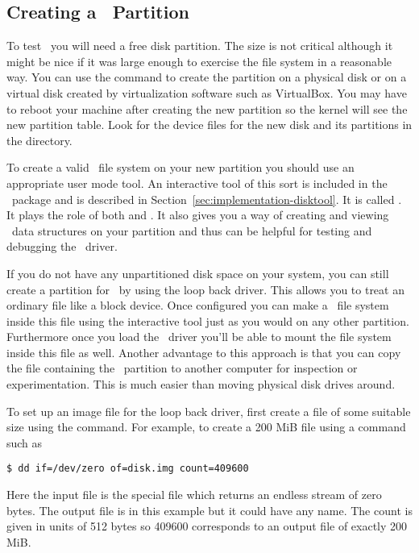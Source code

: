 \subsection{Creating a \GenericFS\ Partition}
\label{sec:partition}

To test \GenericFS\ you will need a free disk partition. The size is not critical although it
might be nice if it was large enough to exercise the file system in a reasonable way. You can
use the  command to create the partition on a physical disk or on a virtual disk
created by virtualization software such as VirtualBox. You may have to reboot your machine after
creating the new partition so the kernel will see the new partition table. Look for the device
files for the new disk and its partitions in the  directory. 

To create a valid \GenericFS\ file system on your new partition you should use an appropriate
user mode tool. An interactive tool of this sort is included in the \GenericFS\ package and is
described in Section~\ref{sec:implementation-disktool}. It is called . It
plays the role of both  and . It also gives you a way of creating
and viewing \GenericFS\ data structures on your partition and thus can be helpful for testing
and debugging the \GenericFS\ driver.

If you do not have any unpartitioned disk space on your system, you can still create a partition
for \GenericFS\ by using the loop back driver. This allows you to treat an ordinary file like a
block device. Once configured you can make a \GenericFS\ file system inside this file using the
interactive tool just as you would on any other partition. Furthermore once you load the
\GenericFS\ driver you'll be able to mount the file system inside this file as well. Another
advantage to this approach is that you can copy the file containing the \GenericFS\ partition to
another computer for inspection or experimentation. This is much easier than moving physical
disk drives around.

To set up an image file for the loop back driver, first create a file of some suitable size
using the  command. For example, to create a 200 MiB file using a command such as
\begin{verbatim}
$ dd if=/dev/zero of=disk.img count=409600
\end{verbatim}

Here the input file is the special file  which returns an endless stream of
zero bytes. The output file is  in this example but it could have any name.
The count is given in units of 512 bytes so 409600 corresponds to an output file of exactly 200
MiB.

